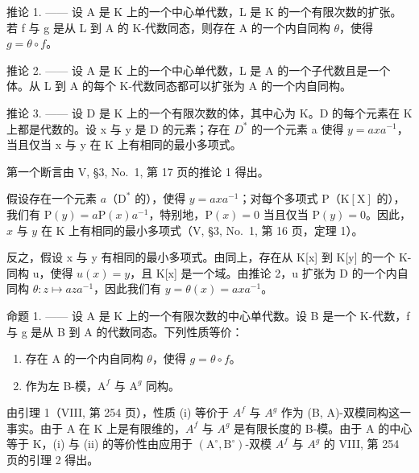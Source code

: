 推论 1. —— 设 A 是 K 上的一个中心单代数，L 是 K 的一个有限次数的扩张。若 f 与 g 是从 L 到 A 的 K-代数同态，则存在 A 的一个内自同构 \(\theta\)，使得 \(g = \theta \circ f\)。

推论 2. —— 设 A 是 K 上的一个中心单代数，L 是 A 的一个子代数且是一个体。从 L 到 A 的每个 K-代数同态都可以扩张为 A 的一个内自同构。

推论 3. —— 设 D 是 K 上的一个有限次数的体，其中心为 K。D 的每个元素在 K 上都是代数的。设 x 与 y 是 D 的元素；存在 \(D^{*}\) 的一个元素 a 使得 \(y = axa^{-1}\)，当且仅当 x 与 y 在 K 上有相同的最小多项式。

第一个断言由 V, §3, No.~1, 第 17 页的推论 1 得出。

假设存在一个元素 \(a\)（\(\mathrm{D}^*\) 的），使得 \(y = axa^{-1}\)；对每个多项式 \(\mathrm{P}\)（\(\mathrm{K}[\mathrm{X}]\) 的），我们有 \(\mathrm{P}(y) = a\mathrm{P}(x)a^{-1}\)，特别地，\(\mathrm{P}(x) = 0\) 当且仅当 \(\mathrm{P}(y) = 0\)。因此，\(x\) 与 \(y\) 在 \(\mathrm{K}\) 上有相同的最小多项式（V, §3, No.~1, 第 16 页，定理 1）。

反之，假设 x 与 y 有相同的最小多项式。由同上，存在从 K{[}x{]} 到 K{[}y{]} 的一个 K-同构 u，使得 \(u(x) = y\)，且 K{[}x{]} 是一个域。由推论 2，u 扩张为 D 的一个内自同构 \(\theta : z \mapsto aza^{-1}\)，因此我们有 \(y = \theta(x) = axa^{-1}\)。

命题 1. —— 设 A 是 K 上的一个有限次数的中心单代数。设 B 是一个 K-代数，f 与 g 是从 B 到 A 的代数同态。下列性质等价：

\begin{enumerate}
\def\labelenumi{(\roman{enumi})}
\item
  存在 A 的一个内自同构 \(\theta\)，使得 \(g = \theta \circ f\)。
\item
  作为左 B-模，\(\mathrm{A}^f\) 与 \(\mathrm{A}^g\) 同构。
\end{enumerate}

由引理 1（VIII, 第 254 页），性质 (i) 等价于 \(A^{f}\) 与 \(A^{g}\) 作为 (B, A)-双模同构这一事实。由于 A 在 K 上是有限维的，\(A^{f}\) 与 \(A^{g}\) 是有限长度的 B-模。由于 A 的中心等于 K，(i) 与 (ii) 的等价性由应用于 \((\mathrm{A}^{\circ}, \mathrm{B}^{\circ})\)-双模 \(A^{f}\) 与 \(A^{g}\) 的 VIII, 第 254 页的引理 2 得出。


